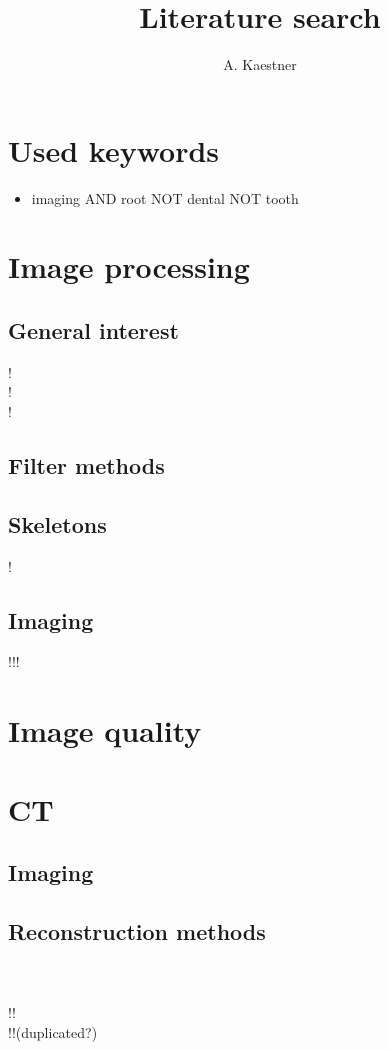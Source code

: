 \documentclass[a4paper,10pt]{article}
\title{Literature search}
\author{A. Kaestner}
\begin{document}
\maketitle

\section{Used keywords}
\begin{itemize}
 \item imaging AND root NOT dental NOT tooth

\end{itemize}

\section{Image processing}
\subsection{General interest}
!\cite{sijbers07}\\
!\cite{welk07}\\
!\cite{zhu10}

\subsection{Filter methods}
\cite{lee08b}

\subsection{Skeletons}
!\cite{hesselink08}

\subsection{Imaging}
!!!\cite{burger11}

\section{Image quality}
\cite{burns11}

\section{CT}
\subsection{Imaging}
\cite{guizar-sicairos11}
\subsection{Reconstruction methods}
\cite{amin11}\\
\cite{bilgic11}\\
!!\cite{yoon10}\\
!!\cite{sungwon10}(duplicated?)
\end{document}
